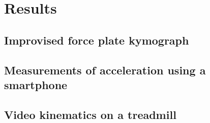 \section{Results}
\label{sec:results}

\subsection{Improvised force plate kymograph}

\subsection{Measurements of acceleration using a smartphone}

\subsection{Video kinematics on a treadmill}
